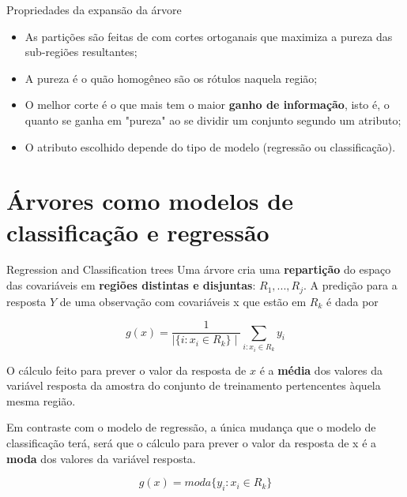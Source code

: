 \documentclass{beamer}
\begin{document}
\begin{frame}{Propriedades da expansão da árvore}
\begin{itemize}
    \item As partições são feitas de com cortes ortoganais que maximiza a pureza das sub-regiões resultantes;
    
    \item A pureza é o quão homogêneo são os rótulos naquela região;
     
    \item O melhor corte é o que mais tem o maior \textbf{ganho de informação}, isto é, o quanto se ganha em "pureza" ao se dividir um conjunto segundo um atributo;
    
    \item O atributo escolhido depende do tipo de modelo (regressão ou classificação).
    
\end{itemize}
\end{frame}

\section{Árvores como modelos de classificação e regressão}

\begin{frame}[t]{Regression and Classification trees}
    Uma árvore cria uma \textbf{repartição} do espaço das covariáveis em \textbf{regiões distintas e disjuntas}: $R_1, ..., R_j$. A predição para a resposta $Y$ de uma observação com covariáveis x que estão em $R_k$ é dada por
    
    \begin{equation}
        g(x) = \frac{1}{\mid\{i:x_i \in R_k\}\mid} \sum_{i:x_i \in R_k} y_i   
    \end{equation}

    O cálculo feito para prever o valor da resposta de $x$ é a \textbf{média} dos valores da variável resposta da amostra do conjunto de treinamento pertencentes àquela mesma região.
    
    Em contraste com o modelo de regressão, a única mudança que o modelo de classificação terá, será que o cálculo para prever o valor da resposta de x é a \textbf{moda} dos valores da variável resposta.
    
    \begin{equation}
        g(x) = moda \{y_i:x_i \in R_k\}
    \end{equation}
    
\end{frame}
\end{document}
